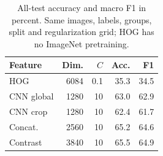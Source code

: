 \begin{table}[t]
\centering\small
\begin{tabular}{lrrrr}
\toprule
Feature & Dim. & $C$ & Acc. & F1 \\
\midrule
HOG & 6084 & 0.1 & 35.3 & 34.5 \\
CNN global & 1280 & 10 & 63.0 & 62.9 \\
CNN crop & 1280 & 10 & 62.4 & 61.7 \\
Concat. & 2560 & 10 & 65.2 & 64.6 \\
Contrast & 3840 & 10 & 65.5 & 64.9 \\
\bottomrule
\end{tabular}
\caption{All-test accuracy and macro F1 in percent. Same images, labels, groups, split and regularization grid; HOG has no ImageNet pretraining.}
\label{tab:results}
\end{table}

